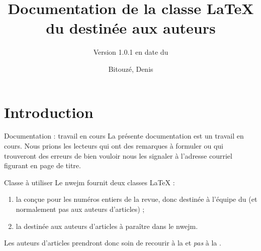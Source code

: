 \documentclass[french,nolocaltoc]{nwejmart}
\newcommand{\releaseversion}{1.0.1}
\newtheorem[style=definition]{fait}
\newtheorem[title=expérience]{experience}
\newtheorem[title-plural=anneaux]{anneau}
\newtheorem[title=idéal,title-plural=idéaux]{ideal}
\begin{document}
\title[Documentation de la classe \LaTeX{} du
\texorpdfstring{\nwejm}{NWEJM}]{Documentation de la classe \LaTeX{} du \nwejm*{}
  destinée aux auteurs}%
%
\subtitle[Version \releaseversion{} (\DTMusedate{release-date})]{\small Version \releaseversion{} en
  date du }%
%
\author[%
affiliation={%
  Université du Littoral Côte d'Opale, Laboratoire de mathématiques pures et
  appliquées (\nolinkurl{denis.bitouze@univ-littoral.fr})%
},%
]{Bitouzé, Denis}
%
\maketitle
%
\etocarticlestylenomarks
\localtableofcontents
%

\section{Introduction}
\label{sec-introduction}

\begin{dbremark}{Documentation : travail en cours}{}
  La présente documentation est un travail en cours. Nous prions les lecteurs
  qui ont des remarques à formuler ou qui trouveront des erreurs de bien vouloir
  nous les signaler à l'adresse courriel figurant en page de titre.
\end{dbremark}

\begin{dbwarning}{Classe à utiliser}{}
  Le \gls{nwejm} fournit deux classes \LaTeX{} :
  \begin{enumerate}
  \item la \nwejmcl{} conçue pour les numéros entiers de la revue, donc destinée
    à l'équipe du \nwejm{} (et normalement pas aux auteurs d'articles) ;
  \item la \nwejmauthorcl{} destinée aux auteurs d'articles à paraître dans le
    \gls{nwejm}.
  \end{enumerate}
  Les auteurs d'articles prendront donc soin de recourir à la \nwejmauthorcl{}
  et \emph{pas} à la \nwejmcl{}.
\end{dbwarning}
\end{document}
